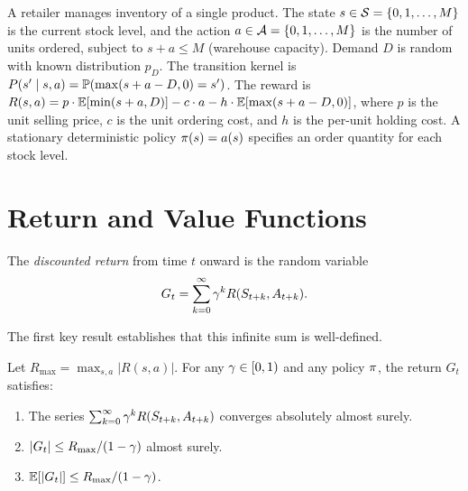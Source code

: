 \documentclass[11pt,a4paper]{article}
\begin{document}
\begin{example}
\label{ex:inventory}
A retailer manages inventory of a single product. The state
$s \in \mathcal{S} = \{0, 1, \ldots, M\}$ is the current stock level,
and the action $a \in \mathcal{A} = \{0, 1, \ldots, M\}$ is the number
of units ordered, subject to $s + a \leq M$ (warehouse capacity).
Demand $D$ is random with known distribution $p_D$. The transition
kernel is $P(s' \mid s, a) = \mathbb{P}(\max(s + a - D, 0) = s')$. The
reward is $R(s,a) = p \cdot \mathbb{E}[\min(s+a, D)] - c \cdot a
- h \cdot \mathbb{E}[\max(s+a-D, 0)]$, where $p$ is the unit selling price,
$c$ is the unit ordering cost, and $h$ is the per-unit holding cost.
A stationary deterministic policy $\pi(s) = a(s)$ specifies an
order quantity for each stock level.
\end{example}


\section{Return and Value Functions}
\label{sec:return-value}

\begin{definition}
\label{def:return}
The \emph{discounted return} from time $t$ onward is the random
variable
\[
    G_t = \sum_{k=0}^{\infty} \gamma^k R(S_{t+k}, A_{t+k}).
\]
\end{definition}

The first key result establishes that this infinite sum is
well-defined.

\begin{proposition}
\label{prop:return-bounded}
Let $R_{\max} = \max_{s,a} |R(s,a)|$. For any $\gamma \in [0,1)$
and any policy $\pi$, the return $G_t$ satisfies:
\begin{enumerate}[nosep]
    \item The series $\sum_{k=0}^{\infty} \gamma^k R(S_{t+k},
    A_{t+k})$ converges absolutely almost surely.
    \item $|G_t| \leq R_{\max} / (1 - \gamma)$ almost surely.
    \item $\mathbb{E}[|G_t|] \leq R_{\max} / (1 - \gamma)$.
\end{enumerate}
\end{proposition}
\end{document}
